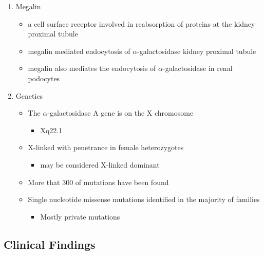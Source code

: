 \documentclass{scrartcl}
\begin{document}
\begin{enumerate}
\item Megalin
\label{sec:org1f457ba}
\begin{itemize}
\item a cell surface receptor involved in reabsorption of proteins at the kidney proximal tubule
\item megalin mediated endocytosis of \(\alpha\)-galactosidase kidney proximal tubule
\item megalin also mediates the endocytosis of \(\alpha\)-galactosidase in renal podocytes
\end{itemize}

\item Genetics
\label{sec:orgd3691a8}
\begin{itemize}
\item The \(\alpha\)-galactosidase A gene is on the X chromosome
\begin{itemize}
\item Xq22.1
\end{itemize}
\item X-linked with penetrance in female heterozygotes
\begin{itemize}
\item may be considered X-linked dominant
\end{itemize}
\item More that 300 of mutations have been found
\item Single nucleotide missense mutations identified in the majority of families
\begin{itemize}
\item Mostly private mutations
\end{itemize}
\end{itemize}
\end{enumerate}

\subsection{Clinical Findings}
\label{sec:orgf669f69}
\end{document}
